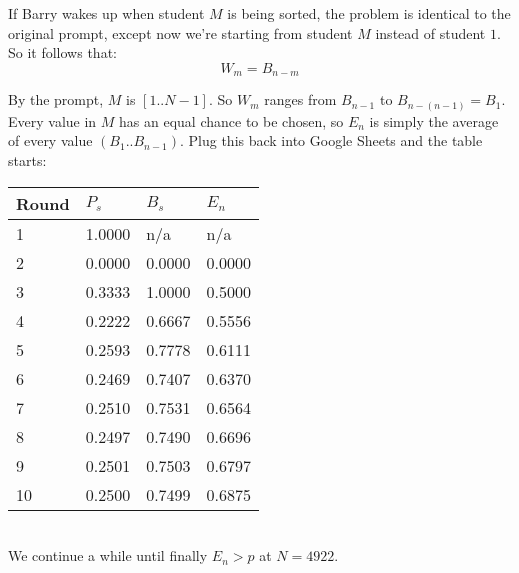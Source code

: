 \documentclass[10pt, letterpaper]{article}
\begin{document}
If Barry wakes up when student $M$ is being sorted, the problem is identical to the original prompt, except now we're starting from student $M$ instead of student $1$.
So it follows that:
\begin{equation*}
    W_m = B_{n-m}
\end{equation*}

By the prompt, $M$ is $[1..N-1]$. So $W_m$ ranges from $B_{n-1}$ to $B_{n-(n-1)} = B_1$.\\

Every value in $M$ has an equal chance to be chosen, so $E_n$ is simply the average of every value $(B_1..B_{n-1})$. Plug this back into Google Sheets and the table starts:\\

\begin{tabular}{l | l | l | l }
    Round   & $P_s$     & $B_s$     & $E_n$     \\ \hline
    1       & 1.0000    & n/a       & n/a       \\
    2       & 0.0000    & 0.0000    & 0.0000    \\
    3       & 0.3333    & 1.0000    & 0.5000    \\
    4       & 0.2222    & 0.6667    & 0.5556    \\
    5       & 0.2593    & 0.7778    & 0.6111    \\
    6       & 0.2469    & 0.7407    & 0.6370    \\
    7       & 0.2510    & 0.7531    & 0.6564    \\
    8       & 0.2497    & 0.7490    & 0.6696    \\
    9       & 0.2501    & 0.7503    & 0.6797    \\
    10      & 0.2500    & 0.7499    & 0.6875    \\
\end{tabular}\\

We continue a while until finally $E_n > p$ at $N = 4922$.
\end{document}
